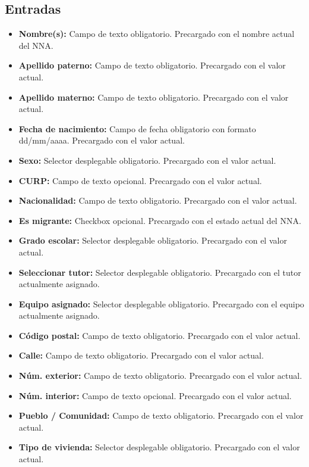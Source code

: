 \subsection{Entradas}
\begin{itemize}
	\item \textbf{Nombre(s):} Campo de texto obligatorio. Precargado con el 
	nombre actual del NNA.
	\item \textbf{Apellido paterno:} Campo de texto obligatorio. Precargado con 
	el valor actual.
	\item \textbf{Apellido materno:} Campo de texto obligatorio. Precargado con 
	el valor actual.
	\item \textbf{Fecha de nacimiento:} Campo de fecha obligatorio con formato 
	dd/mm/aaaa. Precargado con el valor actual.
	\item \textbf{Sexo:} Selector desplegable obligatorio. Precargado con el 
	valor actual.
	\item \textbf{CURP:} Campo de texto opcional. Precargado con el valor actual.
	\item \textbf{Nacionalidad:} Campo de texto obligatorio. Precargado con el 
	valor actual.
	\item \textbf{Es migrante:} Checkbox opcional. Precargado con el estado 
	actual del NNA.
	\item \textbf{Grado escolar:} Selector desplegable obligatorio. Precargado 
	con el valor actual.
	\item \textbf{Seleccionar tutor:} Selector desplegable obligatorio. Precargado 
	con el tutor actualmente asignado.
	\item \textbf{Equipo asignado:} Selector desplegable obligatorio. Precargado 
	con el equipo actualmente asignado.
	\item \textbf{Código postal:} Campo de texto obligatorio. Precargado con el 
	valor actual.
	\item \textbf{Calle:} Campo de texto obligatorio. Precargado con el valor 
	actual.
	\item \textbf{Núm. exterior:} Campo de texto obligatorio. Precargado con el 
	valor actual.
	\item \textbf{Núm. interior:} Campo de texto opcional. Precargado con el 
	valor actual.
	\item \textbf{Pueblo / Comunidad:} Campo de texto obligatorio. Precargado 
	con el valor actual.
	\item \textbf{Tipo de vivienda:} Selector desplegable obligatorio. Precargado 
	con el valor actual.
\end{itemize}

